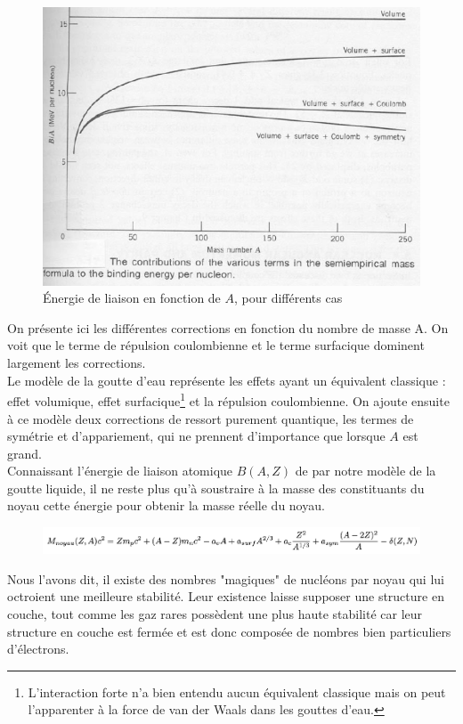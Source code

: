 \begin{figure}[ht]
    \centering
    \includegraphics{Images4/correction.PNG}
    \caption{Énergie de liaison en fonction de $A$, pour différents cas}
\end{figure}
On présente ici les différentes corrections en fonction du nombre de masse A. On voit que le terme de répulsion coulombienne et le terme surfacique dominent largement les corrections.\\
Le modèle de la goutte d'eau représente les effets ayant un équivalent classique : effet volumique, effet surfacique\footnote{L'interaction forte n'a bien entendu aucun équivalent classique mais on peut l'apparenter à la force de van der Waals dans les gouttes d'eau.} et la répulsion coulombienne. On ajoute ensuite à ce modèle deux corrections de ressort purement quantique, les termes de symétrie et d'appariement, qui ne prennent d'importance que lorsque $A$ est grand.\\

Connaissant l'énergie de liaison atomique $B(A,Z)$ de par notre modèle de la goutte liquide, il ne reste plus qu'à soustraire à la masse des constituants du noyau cette énergie pour obtenir la masse réelle du noyau.\\

\begin{figure}[ht]
    \centering
    \includegraphics[width=\textwidth] {Images4/Bethe.PNG}
\end{figure}
Nous l'avons dit, il existe des nombres "magiques" de nucléons par noyau qui lui octroient une meilleure stabilité. Leur existence laisse supposer une structure en couche, tout comme les gaz rares possèdent une plus haute stabilité car leur structure en couche est fermée et est donc composée de nombres bien particuliers d'électrons.


